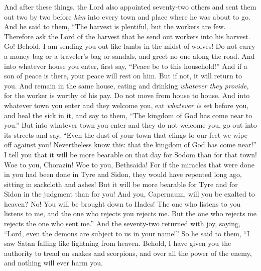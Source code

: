 \begin{biblechapter} %
 And after these things, the Lord also appointed seventy-two others and sent them out two by two before \textit{him} into every town and place where he was about to go.
\verse And he said to them, “The harvest is plentiful, but the workers are few. Therefore ask the Lord of the harvest that he send out workers into his harvest.
\verse Go! Behold, I am sending you out like lambs in the midst of wolves!
\verse Do not carry a money bag or a traveler’s bag or sandals, and greet no one along the road.
\verse And into whatever house you enter, first say, “Peace be to this household!”
\verse And if a son of peace is there, your peace will rest on him. But if not, it will return to you.
\verse And remain in the same house, eating and drinking \textit{whatever they provide}, for the worker is worthy of his pay. Do not move from house to house.
\verse And into whatever town you enter and they welcome you, eat \textit{whatever is} set before you,
\verse and heal the sick in it, and say to them, “The kingdom of God has come near to you.”
\verse But into whatever town you enter and they do not welcome you, go out into its streets and say,
\verse “Even the dust of your town that clings to our feet we wipe off against you! Nevertheless know this: that the kingdom of God has come near!”
\verse I tell you that it will be more bearable on that day for Sodom than for that town!
\verse Woe to you, Chorazin! Woe to you, Bethsaida! For if the miracles that were done in you had been done in Tyre and Sidon, they would have repented long ago, sitting in sackcloth and ashes!
\verse But it will be more bearable for Tyre and for Sidon in the judgment than for you!
\verse And you, Capernaum, will you be exalted to heaven? No! You will be brought down to Hades!
\verse The one who listens to you listens to me, and the one who rejects you rejects me. But the one who rejects me rejects the one who sent me.”
\verse And the seventy-two returned with joy, saying, “Lord, even the demons are subject to us in your name!”
\verse So he said to them, “I saw Satan falling like lightning from heaven.
\verse Behold, I have given you the authority to tread on snakes and scorpions, and over all the power of the enemy, and nothing will ever harm you.

\end{biblechapter}
